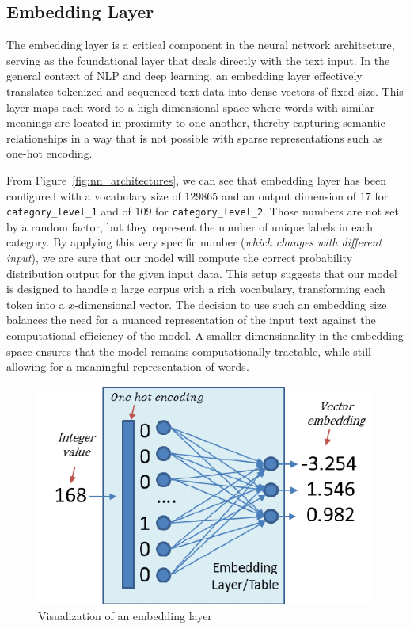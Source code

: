 \subsection{Embedding Layer}
The embedding layer is a critical component in the neural network architecture, serving as the foundational layer that deals directly with the text input. In the general context of NLP and deep learning, an embedding layer effectively translates tokenized and sequenced text data into dense vectors of fixed size. This layer maps each word to a high-dimensional space where words with similar meanings are located in proximity to one another, thereby capturing semantic relationships in a way that is not possible with sparse representations such as one-hot encoding.

From Figure~\ref{fig:nn_architectures}, we can see that embedding layer has been configured with a vocabulary size of $\num{129865}$ and an output dimension of $17$ for \verb|category_level_1| and of $109$ for \verb|category_level_2|. Those numbers are not set by a random factor, but they represent the number of unique labels in each category. By applying this very specific number (\textit{which changes with different input}), we are sure that our model will compute the correct probability distribution output for the given input data. This setup suggests that our model is designed to handle a large corpus with a rich vocabulary, transforming each token into a $x$-dimensional vector. The decision to use such an embedding size balances the need for a nuanced representation of the input text against the computational efficiency of the model. A smaller dimensionality in the embedding space ensures that the model remains computationally tractable, while still allowing for a meaningful representation of words.

\begin{figure}
	\centering
	\includegraphics[width=\linewidth]{Images/embedding_visualize.png}
	\caption{Visualization of an embedding layer}
\end{figure}

